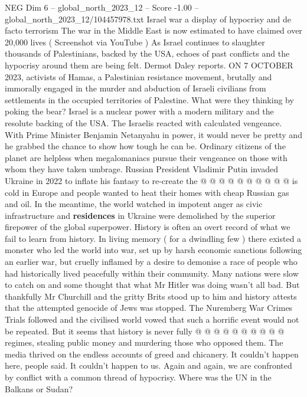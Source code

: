 \begin{textsample}{NEG Dim 6 – global\_north\_2023\_12 – Score -1.00 – global\_north\_2023\_12/104457978.txt}  \label{ex:f6_neg_320}
Israel war a display of hypocrisy and de facto terrorism The war in the Middle East is now estimated to have claimed over 20,000 lives ( Screenshot via YouTube ) As Israel continues to slaughter thousands of Palestinians, backed by the USA, echoes of past conflicts and the hypocrisy around them are being felt.
Dermot Daley reports.
ON 7 OCTOBER 2023, activists of Hamas, a Palestinian resistance movement, brutally and immorally engaged in the murder and abduction of Israeli civilians from settlements in the occupied territories of Palestine.
What were they thinking by poking the bear?
Israel is a nuclear power with a modern military and the resolute backing of the USA.
The Israelis reacted with calculated vengeance.
With Prime Minister Benjamin Netanyahu in power, it would never be pretty and he grabbed the chance to show how tough he can be.
Ordinary citizens of the planet are helpless when megalomaniacs pursue their vengeance on those with whom they have taken umbrage.
Russian President Vladimir Putin invaded Ukraine in 2022 to inflate his fantasy to re-create the @ @ @ @ @ @ @ @ @ @ is cold in Europe and people wanted to heat their homes with cheap Russian gas and oil.
In the meantime, the world watched in impotent anger as civic infrastructure and \textbf{residences} in Ukraine were demolished by the superior firepower of the global superpower.
History is often an overt record of what we fail to learn from history.
In living memory ( for a dwindling few ) there existed a monster who led the world into war, set up by harsh economic sanctions following an earlier war, but cruelly inflamed by a desire to demonise a race of people who had historically lived peacefully within their community.
Many nations were slow to catch on and some thought that what Mr Hitler was doing wasn't all bad.
But thankfully Mr Churchill and the gritty Brits stood up to him and history attests that the attempted genocide of Jews was stopped.
The Nuremberg War Crimes Trials followed and the civilised world vowed that such a horrific event would not be repeated.
But it seems that history is never fully @ @ @ @ @ @ @ @ @ @ regimes, stealing public money and murdering those who opposed them.
The media thrived on the endless accounts of greed and chicanery.
It couldn't happen here, people said.
It couldn't happen to us.
Again and again, we are confronted by conflict with a common thread of hypocrisy.
Where was the UN in the Balkans or Sudan?

\end{textsample}
